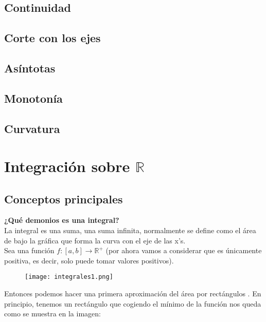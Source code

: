 \section{Continuidad}
\section{Corte con los ejes}
\section{Asíntotas}
\section{Monotonía}
\section{Curvatura}
\chapter{Integración sobre $\mathbb{R}$}
\minitoc

\newpage

\section{Conceptos principales}
\noindent
\textbf{¿Qué demonios es una integral?}\\[1ex]
La integral es una suma, una suma infinita, normalmente se define como el área de bajo la gráfica que forma la curva con el eje de las x's.\\[2ex]
\noindent
Sea una función $f\colon [a,b] \longrightarrow \mathbb{R}^+$ (por ahora vamos a considerar que es únicamente positiva, es decir, solo puede tomar valores positivos). 
\begin{figure}[H]
\begin{center}
\graphicspath{{imagenes_analisis/}}
\texttt{[image: integrales1.png]}
\label{Función $f(x)$}
\end{center}
\end{figure}

Entonces podemos hacer una primera aproximación del área por rectángulos . En principio, tenemos un rectángulo que cogiendo el mínimo de la función nos queda como se muestra en la imagen:

